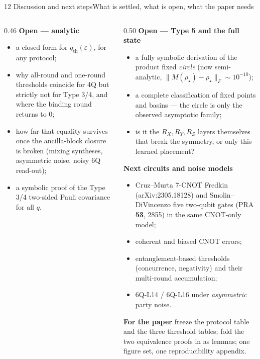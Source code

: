 \documentclass[aspectratio=169,10pt,t]{beamer}
\begin{document}
\begin{frame}{12 \quad Discussion and next steps}{What is settled, what is open, what the paper needs}
\begin{columns}[T,onlytextwidth]
\begin{column}{0.46\textwidth}
    \textbf{Open --- analytic}
    \begin{itemize}\itemsep0.15ex
      \item a closed form for $q_{\mathrm{th}}(\varepsilon)$, for any
            protocol;
      \item why all-round and one-round thresholds coincide for 4Q but
            strictly not for Type 3/4, and where the binding round
            returns to 0;
      \item how far that equality survives once the ancilla-block
            closure is broken (mixing syntheses, asymmetric noise, noisy
            6Q read-out);
      \item a symbolic proof of the Type 3/4 two-sided Pauli covariance
            for all $q$.
    \end{itemize}
  \end{column}
  \begin{column}{0.50\textwidth}\vspace{0pt}
    \textbf{Open --- Type 5 and the full state}
    \begin{itemize}\itemsep0.25ex
      \item a fully symbolic derivation of the product fixed \emph{circle}
            (now semi-analytic,
            $\|M(\rho_\star)-\rho_\star\|_F\sim10^{-10}$);
      \item a complete classification of fixed points and basins --- the
            circle is only the observed asymptotic family;
      \item is it the $R_X,R_Y,R_Z$ layers themselves that break the
            symmetry, or only this learned placement?
    \end{itemize}
    \medskip

    \textbf{Next circuits and noise models}
    \begin{itemize}\itemsep0.25ex
      \item Cruz--Murta 7-CNOT Fredkin (arXiv:2305.18128) and
            Smolin--DiVincenzo five two-qubit gates (PRA \textbf{53}, 2855)
            in the same CNOT-only model;
      \item coherent and biased CNOT errors;
      \item entanglement-based thresholds (concurrence, negativity) and
            their multi-round accumulation;
      \item 6Q-L14 / 6Q-L16 under \emph{asymmetric} party noise.
    \end{itemize}
    \medskip

    \textbf{For the paper}\; freeze the protocol table and the three
    threshold tables; fold the two equivalence proofs in as lemmas;
    one figure set, one reproducibility appendix.
  \end{column}
  \end{columns}
\end{frame}
\end{document}
